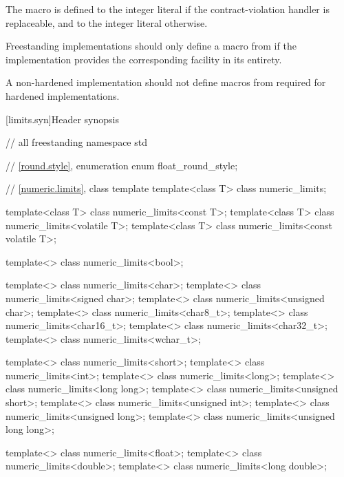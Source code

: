 \pnum
The macro  is defined to
the integer literal 
if the contract-violation handler is replaceable, and
to the integer literal  otherwise.

\pnum
\recommended
Freestanding implementations should only define a macro from 
if the implementation provides the corresponding facility in its entirety.

\pnum
\recommended
A non-hardened implementation should not define macros from 
required for hardened implementations.

[limits.syn]{Header  synopsis}

%
%
%
%

\begin{codeblock}
// all freestanding
namespace std {
  // \ref{round.style}, enumeration 
  enum float_round_style;

  // \ref{numeric.limits}, class template 
  template<class T> class numeric_limits;

  template<class T> class numeric_limits<const T>;
  template<class T> class numeric_limits<volatile T>;
  template<class T> class numeric_limits<const volatile T>;

  template<> class numeric_limits<bool>;

  template<> class numeric_limits<char>;
  template<> class numeric_limits<signed char>;
  template<> class numeric_limits<unsigned char>;
  template<> class numeric_limits<char8_t>;
  template<> class numeric_limits<char16_t>;
  template<> class numeric_limits<char32_t>;
  template<> class numeric_limits<wchar_t>;

  template<> class numeric_limits<short>;
  template<> class numeric_limits<int>;
  template<> class numeric_limits<long>;
  template<> class numeric_limits<long long>;
  template<> class numeric_limits<unsigned short>;
  template<> class numeric_limits<unsigned int>;
  template<> class numeric_limits<unsigned long>;
  template<> class numeric_limits<unsigned long long>;

  template<> class numeric_limits<float>;
  template<> class numeric_limits<double>;
  template<> class numeric_limits<long double>;
}
\end{codeblock}

